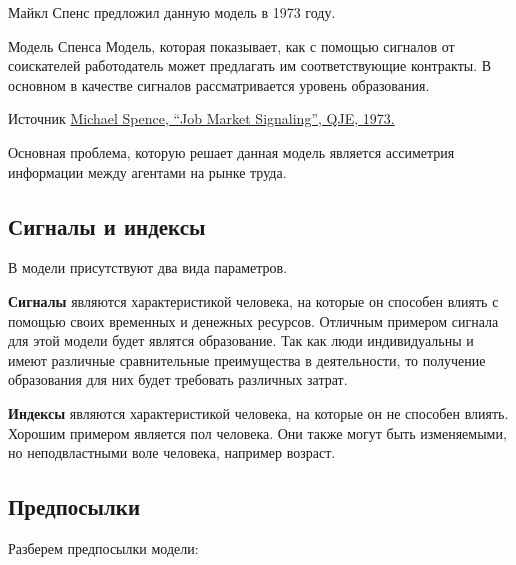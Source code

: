 \indent\setlength{\parindent}{1em}Майкл Спенс предложил данную модель в 1973 году.

\begin{mybox}{Модель Спенса}
    Модель, которая показывает, как с помощью сигналов от соискателей работодатель может предлагать им соответствующие
    контракты. В основном в качестве сигналов рассматривается уровень образования.
\end{mybox}

\begin{mybox}{Источник}
    \href{https://www.sfu.ca/~allen/Spence.pdf}{Michael Spence, “Job Market Signaling”, QJE, 1973.}
\end{mybox}

\indent\setlength{\parindent}{1em}Основная проблема, которую решает данная модель является ассиметрия информации между
агентами на рынке труда.

\subsection{Сигналы и индексы}

\indent\setlength{\parindent}{1em}В модели присутствуют два вида параметров.\smallskip

\indent\setlength{\parindent}{1em}\textbf{Сигналы} являются характеристикой человека, на которые он способен влиять с
помощью своих временных и денежных ресурсов. Отличным примером сигнала для этой модели будет являтся образование. Так
как люди индивидуальны и имеют различные сравнительные преимущества в деятельности, то получение образования для них
будет требовать различных затрат.\smallskip

\indent\setlength{\parindent}{1em}\textbf{Индексы} являются характеристикой человека, на которые он не способен влиять.
Хорошим примером является пол человека. Они также могут быть изменяемыми, но неподвластными воле человека, например
возраст.

\subsection{Предпосылки}

\indent\setlength{\parindent}{1em}Разберем предпосылки модели:


